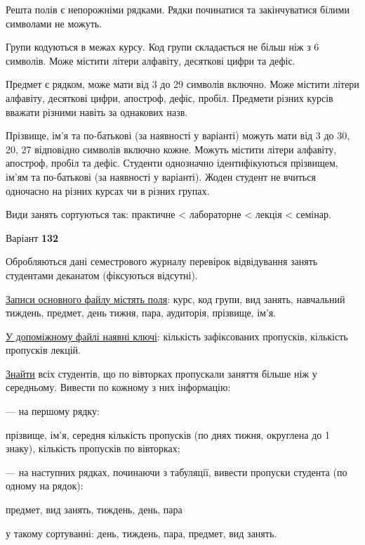 \documentclass[11pt, ukrainian]{article}
\begin{document}
Решта полів є непорожніми рядками.
Рядки починатися та закінчуватися білими символами не можуть.

Групи кодуються в межах курсу.
Код групи складається не більш ніж з 6 символів.
Може містити літери алфавіту, десяткові цифри та дефіс.

Предмет є рядком, може мати від 3 до 29 символів включно.
Може містити літери алфавіту, десяткові цифри, апостроф, дефіс, пробіл.
Предмети різних курсів вважати різними навіть за однакових назв.

Прізвище, ім’я та по-батькові (за наявності у варіанті)
можуть мати від 3 до 30, 20, 27 відповідно символів включно кожне.
Можуть містити літери алфавіту, апостроф, пробіл та дефіс.
Студенти однозначно ідентифікуються прізвищем, ім’ям та по-батькові (за наявності у варіанті).
Жоден студент не вчиться одночасно на різних курсах чи в різних групах.

Види занять сортуються так: практичне < лабораторне < лекція < семінар.





\par
\newpage
{\center Варіант  \No \textbf { 132 }\par}
\bigskip
Обробляються дані семестрового журналу перевірок відвідування занять студентами деканатом (фіксуються відсутні). 

\underline{Записи основного файлу містять поля}: курс, код групи, вид занять, навчальний тиждень, предмет, день тижня, пара, аудиторія, прізвище, ім’я.

\underline{У допоміжному файлі наявні ключі}: кількість зафіксованих пропусків, кількість пропусків лекцій.

\underline{Знайти} всіх студентів, що по вівторках пропускали заняття більше ніж у середньому. Вивести по кожному з них інформацію:\par
{\noindent}--- на першому рядку:\par
прізвище, ім’я, середня кількість пропусків (по днях тижня, округлена до 1 знаку), кількість пропусків по вівторках;

{\noindent}--- на наступних рядках, починаючи з табуляції, вивести пропуски студента (по одному на рядок):\par
предмет, вид занять, тиждень, день, пара

{\noindent}у такому сортуванні: день, тиждень, пара, предмет, вид занять.
\end{document}
